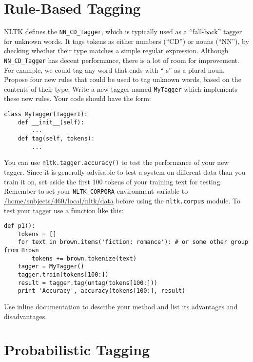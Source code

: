 \documentclass{460}
\begin{document}
\maketitle

\section{Rule-Based Tagging}

NLTK defines the \texttt{NN\_CD\_Tagger}, which is typically used as a
``fall-back'' tagger for unknown words.  It tags tokens as either
numbers (``CD'') or nouns (``NN''), by checking whether their type
matches a simple regular expression.  Although \texttt{NN\_CD\_Tagger}
has decent performance, there is a lot of room for improvement.  For
example, we could tag any word that ends with ``-s'' as a plural noun.
Propose four new rules that could be used to tag unknown words, based
on the contents of their type.
Write a new tagger named \texttt{MyTagger} which implements these new
rules.  Your code should have the form:

\begin{verbatim}
class MyTagger(TaggerI):
    def __init__(self):
        ...
    def tag(self, tokens):
        ...
\end{verbatim}

You can use \texttt{nltk.tagger.accuracy()}
to test the performance of your new tagger.  Since it is generally
advisable to test a system on different data than you train it on,
set aside the first 100 tokens of your training text
for testing.  Remember to set your
\texttt{NLTK\_CORPORA} environment variable to
\url{/home/subjects/460/local/nltk/data} before using the
\texttt{nltk.corpus} module.
To test your tagger use a function like this:

\begin{verbatim}
def p1():
    tokens = []
    for text in brown.items('fiction: romance'): # or some other group from Brown
        tokens += brown.tokenize(text)
    tagger = MyTagger()
    tagger.train(tokens[100:])
    result = tagger.tag(untag(tokens[100:]))
    print 'Accuracy', accuracy(tokens[100:], result)
\end{verbatim}

Use inline documentation to describe your method and list its advantages
and disadvantages.

\section{Probabilistic Tagging}
\end{document}
